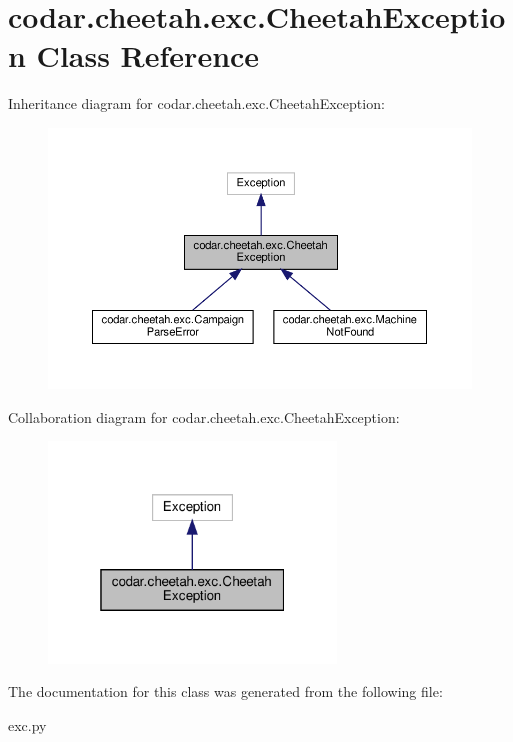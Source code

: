 \hypertarget{classcodar_1_1cheetah_1_1exc_1_1_cheetah_exception}{}\section{codar.\+cheetah.\+exc.\+Cheetah\+Exception Class Reference}
\label{classcodar_1_1cheetah_1_1exc_1_1_cheetah_exception}


Inheritance diagram for codar.\+cheetah.\+exc.\+Cheetah\+Exception\+:
\nopagebreak
\begin{figure}[H]
\begin{center}
\leavevmode
\includegraphics[width=350pt]{classcodar_1_1cheetah_1_1exc_1_1_cheetah_exception__inherit__graph}
\end{center}
\end{figure}


Collaboration diagram for codar.\+cheetah.\+exc.\+Cheetah\+Exception\+:
\nopagebreak
\begin{figure}[H]
\begin{center}
\leavevmode
\includegraphics[width=217pt]{classcodar_1_1cheetah_1_1exc_1_1_cheetah_exception__coll__graph}
\end{center}
\end{figure}


The documentation for this class was generated from the following file\+:\begin{DoxyCompactItemize}
\item 
exc.\+py\end{DoxyCompactItemize}

